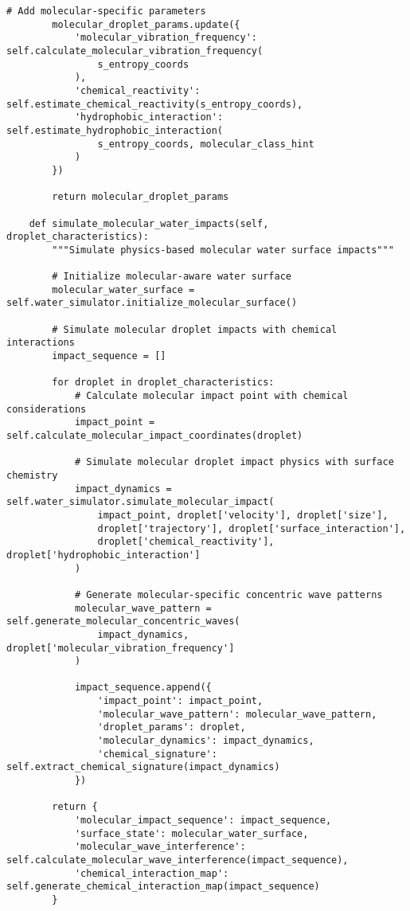 \documentclass[12pt,a4paper]{article}
\begin{document}
\begin{lstlisting}[style=pythonstyle, caption=Core Ion-to-Drip Implementation for Mass Spectrometry]
        # Add molecular-specific parameters
        molecular_droplet_params.update({
            'molecular_vibration_frequency': self.calculate_molecular_vibration_frequency(
                s_entropy_coords
            ),
            'chemical_reactivity': self.estimate_chemical_reactivity(s_entropy_coords),
            'hydrophobic_interaction': self.estimate_hydrophobic_interaction(
                s_entropy_coords, molecular_class_hint
            )
        })
        
        return molecular_droplet_params
    
    def simulate_molecular_water_impacts(self, droplet_characteristics):
        """Simulate physics-based molecular water surface impacts"""
        
        # Initialize molecular-aware water surface
        molecular_water_surface = self.water_simulator.initialize_molecular_surface()
        
        # Simulate molecular droplet impacts with chemical interactions
        impact_sequence = []
        
        for droplet in droplet_characteristics:
            # Calculate molecular impact point with chemical considerations
            impact_point = self.calculate_molecular_impact_coordinates(droplet)
            
            # Simulate molecular droplet impact physics with surface chemistry
            impact_dynamics = self.water_simulator.simulate_molecular_impact(
                impact_point, droplet['velocity'], droplet['size'],
                droplet['trajectory'], droplet['surface_interaction'],
                droplet['chemical_reactivity'], droplet['hydrophobic_interaction']
            )
            
            # Generate molecular-specific concentric wave patterns
            molecular_wave_pattern = self.generate_molecular_concentric_waves(
                impact_dynamics, droplet['molecular_vibration_frequency']
            )
            
            impact_sequence.append({
                'impact_point': impact_point,
                'molecular_wave_pattern': molecular_wave_pattern,
                'droplet_params': droplet,
                'molecular_dynamics': impact_dynamics,
                'chemical_signature': self.extract_chemical_signature(impact_dynamics)
            })
        
        return {
            'molecular_impact_sequence': impact_sequence,
            'surface_state': molecular_water_surface,
            'molecular_wave_interference': self.calculate_molecular_wave_interference(impact_sequence),
            'chemical_interaction_map': self.generate_chemical_interaction_map(impact_sequence)
        }
    

\end{lstlisting}
\end{document}
